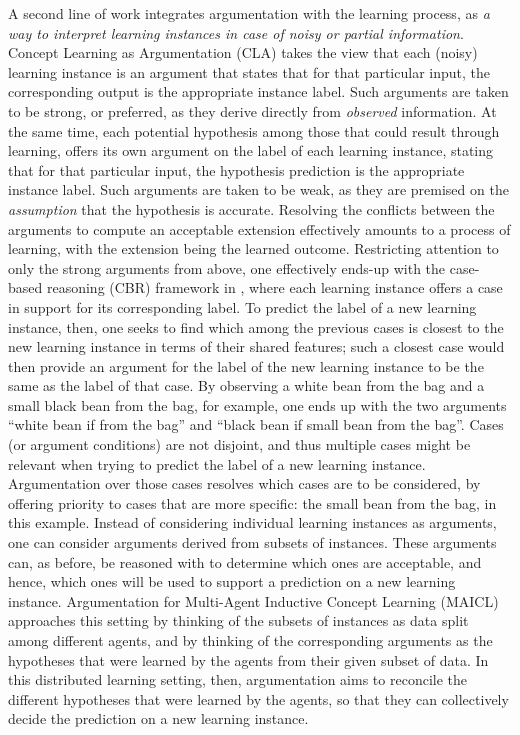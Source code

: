 A second line of work integrates argumentation with the learning process, as \emph{a way to interpret learning instances in case of noisy or partial information}.
Concept Learning as Argumentation (CLA)  takes the view that each (noisy) learning instance is an argument that states that for that particular input, the corresponding output is the appropriate instance label. Such arguments are taken to be strong, or preferred, as they derive directly from \emph{observed} information. At the same time, each potential hypothesis among those that could result through learning, offers its own argument on the label of each learning instance, stating that for that particular input, the hypothesis prediction is the appropriate instance label. Such arguments are taken to be weak, as they are premised on the \emph{assumption} that the hypothesis is accurate. Resolving the conflicts between the arguments to compute an acceptable extension effectively amounts to a process of learning, with the extension being the learned outcome.
Restricting attention to only the strong arguments from above, one effectively ends-up with the case-based reasoning (CBR) framework in , where each learning instance offers a case in support for its corresponding label. To predict the label of a new learning instance, then, one seeks to find which among the previous cases is closest to the new learning instance in terms of their shared features; such a closest case would then provide an argument for the label of the new learning instance to be the same as the label of that case.
By observing a white bean from the bag and a small black bean from the bag, for example, one ends up with the two arguments ``white bean if from the bag'' and ``black bean if small bean from the bag''. Cases (or argument conditions) are not disjoint, and thus multiple cases might be relevant when trying to predict the label of a new learning instance. Argumentation over those cases resolves which cases are to be considered, by offering priority to cases that are more specific: the small bean from the bag, in this example.
Instead of considering individual learning instances as arguments, one can consider arguments derived from subsets of instances. These arguments can, as before, be reasoned with to determine which ones are acceptable, and hence, which ones will be used to support a prediction on a new learning instance. Argumentation for Multi-Agent Inductive Concept Learning (MAICL)  approaches this setting by thinking of the subsets of instances as data split among different agents, and by thinking of the corresponding arguments as the hypotheses that were learned by the agents from their given subset of data. In this distributed learning setting, then, argumentation aims to reconcile the different hypotheses that were learned by the agents, so that they can collectively decide the prediction on a new learning instance.

